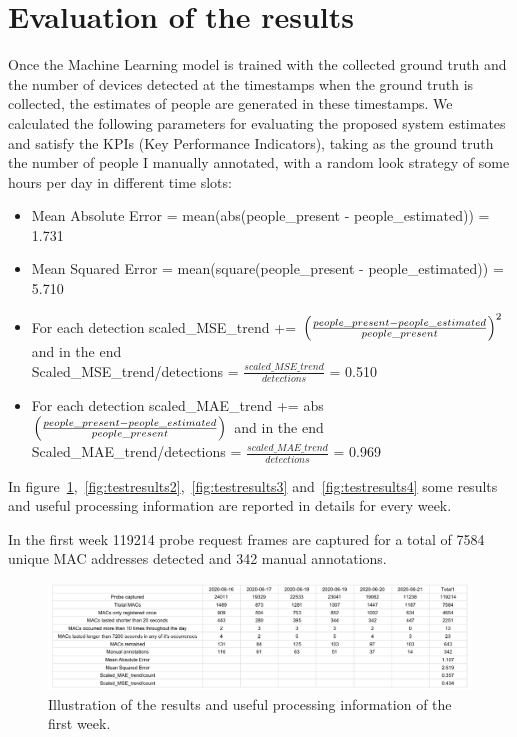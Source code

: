 \section{Evaluation of the results}
\label{sec:evalres}
\vspace{0.2 cm} 

Once the Machine Learning model is trained with the collected ground truth and the number of devices detected at the timestamps when the ground truth is collected, the estimates of people are generated in these timestamps. We calculated the following parameters for evaluating the proposed system estimates and satisfy the KPIs (Key Performance Indicators), taking as the ground truth the number of people I manually annotated, with a random look strategy of some hours per day in different time slots:
\begin{itemize}
  \item Mean Absolute Error = mean(abs(people\_present - people\_estimated)) = 1.731
  \item Mean Squared Error = mean(square(people\_present - people\_estimated)) = 5.710
  \item For each detection scaled\_MSE\_trend += $\Bigl(\frac{people\_present - people\_estimated}{people\_present} \Bigr)^{2}$ and in the end\\Scaled\_MSE\_trend/detections = $\frac{scaled\_MSE\_trend}{detections}$ = 0.510
  \item For each detection scaled\_MAE\_trend += abs$\Bigl(\frac{people\_present - people\_estimated}{people\_present} \Bigr)$ and in the end\\Scaled\_MAE\_trend/detections = $\frac{scaled\_MAE\_trend}{detections}$ = 0.969
\end{itemize}

In figure~\ref{fig:testresults1},~\ref{fig:testresults2},~\ref{fig:testresults3} and~\ref{fig:testresults4} some results and useful processing information are reported in details for every week.

In the first week 119214 probe request frames are captured for a total of 7584 unique MAC addresses detected and 342 manual annotations.

\begin{figure}[H]
\centering 
\includegraphics[width=1\textwidth]{images/testresults1} 
\caption{Illustration of the results and useful processing information of the first week.}
\label{fig:testresults1}
\end{figure}

